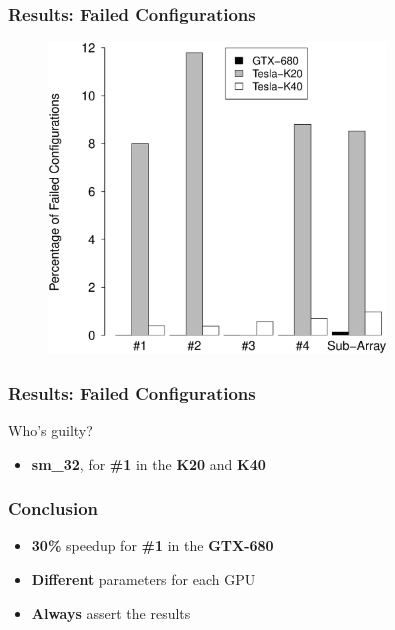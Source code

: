 \documentclass[10pt, compress]{beamer}
\begin{document}
\begin{frame}[fragile]
    \frametitle{Results: Failed Configurations}
    \begin{figure}[htpb]
        \centering
        \includegraphics[width=0.8\textwidth]{FailedSummary}
    \end{figure}
\end{frame}

\begin{frame}[fragile]
  \frametitle{Results: Failed Configurations}
  Who's guilty?
  \begin{itemize}
      \item \alert{\bf sm\_32}, for \alert{\bf \#1} in the \alert{\bf K20} and \alert{\bf K40}
  \end{itemize}
\end{frame}

\begin{frame}[fragile]
  \frametitle{Conclusion}
  \begin{itemize}
      \item \alert{\bf 30\%} speedup for \alert{\bf \#1} in the \alert{\bf GTX-680}
          \pause
      \item \alert{\bf Different} parameters for each GPU
          \pause
      \item \alert{\bf Always} assert the results
  \end{itemize}
\end{frame}


\maketitle
\end{document}
